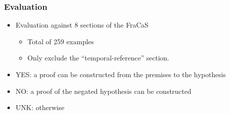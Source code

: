 \documentclass[11pt]{beamer}
\begin{document}
\begin{frame}
  \frametitle{Evaluation}
  \begin{itemize}
  \item Evaluation against 8 sections of the FraCaS
    \begin{itemize}
    \item Total of 259 examples
    \item Only exclude the ``temporal-reference'' section.
    \end{itemize}
  \item YES: a proof can be constructed from the premises to the hypothesis
  \item NO: a proof of the negated hypothesis can be constructed
  \item UNK: otherwise
  \end{itemize}
\end{frame}
\end{document}

